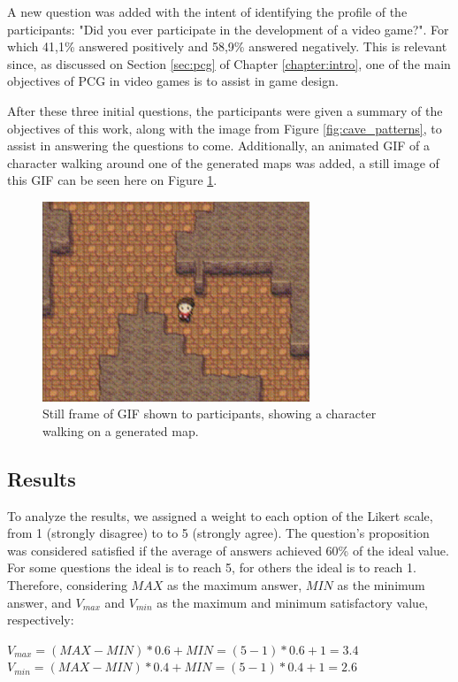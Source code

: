 A new question was added with the intent of identifying the profile of the participants: "Did you ever participate in the development of a video game?". For which 41,1\% answered positively and 58,9\% answered negatively. This is relevant since, as discussed on Section \ref{sec:pcg} of Chapter \ref{chapter:intro}, one of the main objectives of PCG in video games is to assist in game design.

After these three initial questions, the participants were given a summary of the objectives of this work, along with the image from Figure \ref{fig:cave_patterns}, to assist in answering the questions to come. Additionally, an animated GIF of a character walking around one of the generated maps was added, a still image of this GIF can be seen here on Figure \ref{fig:gif}.

\begin{figure}[h]
    \caption{Still frame of GIF shown to participants, showing a character walking on a generated map.}
    \centerline{\includegraphics[width=8cm]{images/survey/gif.png}}
    \label{fig:gif}
\end{figure}

\subsection{Results}

To analyze the results, we assigned a weight to each option of the Likert scale, from 1 (strongly disagree) to to 5 (strongly agree). The question's proposition was considered satisfied if the average of answers achieved 60\% of the ideal value. For some questions the ideal is to reach 5, for others the ideal is to reach 1. Therefore, considering \(MAX\) as the maximum answer, \(MIN\) as the minimum answer, and \(V_{max}\) and \(V_{min}\) as the maximum and minimum satisfactory value, respectively:

\begin{center}
\(V_{max} = (MAX - MIN) * 0.6 + MIN = (5 - 1) * 0.6 + 1= 3.4\)
\(V_{min} = (MAX - MIN) * 0.4 + MIN = (5 - 1) * 0.4 + 1 = 2.6\)
\end{center}

